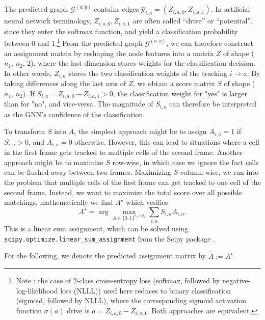 \documentclass[10pt,conference,compsocconf,a4paper]{IEEEtran}
\newcommand{\G}{\mathcal{G}}
\renewcommand{\vec}[1]{\boldsymbol{#1}}
\begin{document}
		The predicted graph $\G^{(a;\hat y)}$ contains edges $\vec{\hat y}_{i,a} = (Z_{i,a,0}, Z_{i,a,1})$. In artificial neural network terminology, $Z_{i,a,0}, Z_{i,a,1}$ are often called ``drive'' or ``potential'', since they enter the softmax function, and yield a classification probability between 0 and 1.\footnote{Note : the case of 2-class cross-entropy loss (softmax, followed by negative-log-likelihood loss (NLLL)) used here reduces to binary classification (sigmoid, followed by NLLL), where the corresponding sigmoid activation function $\sigma(a)$ drive is $a = Z_{i,a,0} - Z_{i,a,1}$. Both approaches are equivalent.}
		From the predicted graph $\G^{(a;\hat y)}$, we can therefore construct an assignment matrix by reshaping the node features into a matrix $Z$ of shape ($n_1$, $n_2$, $2$), where the last dimension stores weights for the classification decision.
		In other words, $Z_{i,a}$ stores the two classification weights of the tracking $i \rightarrow a$. By taking differences along the last axis of $Z$, we obtain a score matrix $S$ of shape ($n_1$, $n_2$). If $S_{i,a} = Z_{i,a,0} - Z_{i,a,1} > 0$, the classification weight for "yes" is larger than for "no", and vice-versa. The magnitude of $S_{i,a}$ can therefore be interpreted as the GNN's confidence of the classification.

		To transform $S$ into $A$, the simplest approach might be to assign $A_{i,a} = 1$ if $S_{i,a} > 0$, and $A_{i,a} = 0$ otherwise. However, this can lead to situations where a cell in the first frame gets tracked to multiple cells of the second frame. Another approach might be to maximize $S$ row-wise, in which case we ignore the fact cells can be flushed away between two frames. Maximizing $S$ column-wise, we run into the problem that multiple cells of the first frame can get tracked to one cell of the second frame. Instead, we want to maximize the total score over all possible matchings, mathematically we find $A^\star$ which verifies
		$$
			A^\star = \arg \max_{A \in \{0, 1\}^{n_1 \times n_2}} \sum_{i,a} S_{i,a} A_{i,a}.
		$$
		This is a linear sum assignment, which can be solved using \texttt{scipy.optimize.linear\_sum\_assignment} from the Scipy package \cite{2020SciPy-NMeth}.

		For the following, we denote the predicted assignment matrix by $\hat A := A^\star$.

\end{document}
